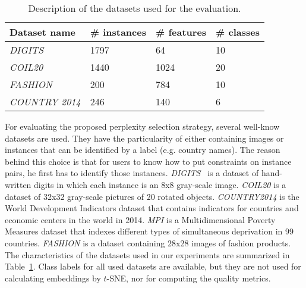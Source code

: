 \begin{table}[h]
\renewcommand{\arraystretch}{1.08}
\centering
\begin{tabular}{l p{1.5cm} p{1.5cm} p{1.5cm}}
\hline
Dataset name & \# instances & \# features & \# classes \\
\hline\hline
\emph{DIGITS} & 1797 & 64 & 10\\
\emph{COIL20} & 1440 & 1024 & 20\\
\emph{FASHION} & 200 & 784 & 10\\
\emph{COUNTRY 2014} & 246 & 140 & 6 \\
\hline
\end{tabular}
\caption{Description of the datasets used for the evaluation.}
\label{tab:dataset}
\end{table}

For evaluating the proposed perplexity selection strategy, several well-know datasets are used. They have the particularity of either containing images or instances that can be identified by a label (e.g. country names). The reason behind this choice is that for users to know how to put constraints on instance pairs, he first has to identify those instances. 
\emph{DIGITS}~\cite{Dua2017} is a dataset of hand-written digits in which each instance is an 8x8 gray-scale image.
\emph{COIL20} \cite{nene1996} is a dataset of 32x32 gray-scale pictures of 20 rotated objects.
\emph{COUNTRY2014} \cite{world2014} is the World Development Indicators dataset that contains indicators for countries and economic centers in the world in 2014.
\emph{MPI} \cite{alkire2017} is a Multidimensional Poverty Measures dataset that indexes different types of simultaneous deprivation in 99 countries.
\emph{FASHION} \cite{xiao2017/online} is a dataset containing 28x28 images of fashion products. 
The characteristics of the datasets used in our experiments are summarized in Table~\ref{tab:dataset}. Class labels for all used datasets are available, but they are not used for calculating embeddings by $t$-SNE, nor for computing the quality metrics.

